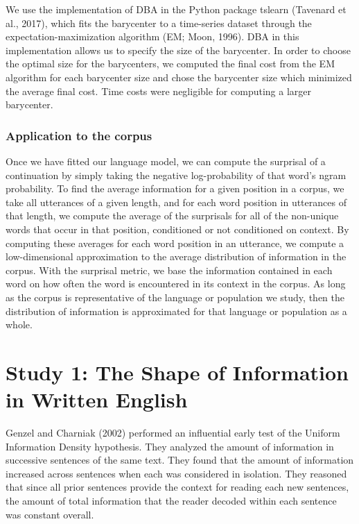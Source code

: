 \documentclass[man,floatsintext]{apa6}
\begin{document}
We use the implementation of DBA in the Python package tslearn (Tavenard et al., 2017), which fits the barycenter to a time-series dataset through the expectation-maximization algorithm (EM; Moon, 1996). DBA in this implementation allows us to specify the size of the barycenter. In order to choose the optimal size for the barycenters, we computed the final cost from the EM algorithm for each barycenter size and chose the barycenter size which minimized the average final cost. Time costs were negligible for computing a larger barycenter.

\hypertarget{application-to-the-corpus}{%
\subsubsection{Application to the corpus}\label{application-to-the-corpus}}

Once we have fitted our language model, we can compute the surprisal of a continuation by simply taking the negative log-probability of that word's ngram probability. To find the average information for a given position in a corpus, we take all utterances of a given length, and for each word position in utterances of that length, we compute the average of the surprisals for all of the non-unique words that occur in that position, conditioned or not conditioned on context. By computing these averages for each word position in an utterance, we compute a low-dimensional approximation to the average distribution of information in the corpus. With the surprisal metric, we base the information contained in each word on how often the word is encountered in its context in the corpus. As long as the corpus is representative of the language or population we study, then the distribution of information is approximated for that language or population as a whole.

\hypertarget{study-1-the-shape-of-information-in-written-english}{%
\section{Study 1: The Shape of Information in Written English}\label{study-1-the-shape-of-information-in-written-english}}

Genzel and Charniak (2002) performed an influential early test of the Uniform Information Density hypothesis. They analyzed the amount of information in successive sentences of the same text. They found that the amount of information increased across sentences when each was considered in isolation. They reasoned that since all prior sentences provide the context for reading each new sentences, the amount of total information that the reader decoded within each sentence was constant overall.
\end{document}

